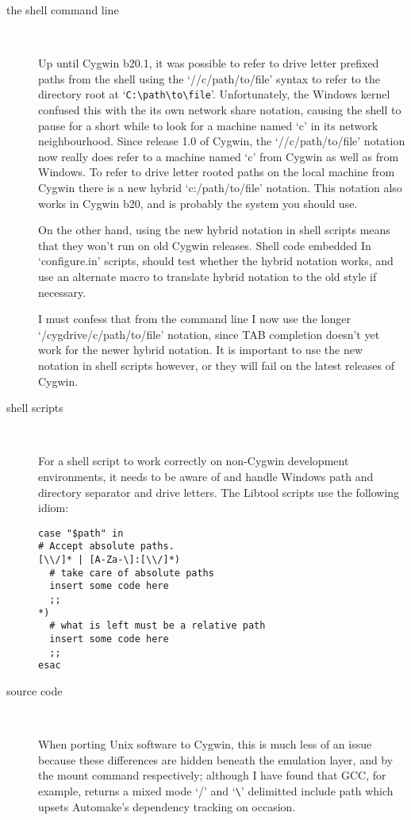 \begin{description}
\item[the shell command line]
\

Up until Cygwin b20.1, it was possible to refer to drive letter prefixed 
paths from the shell using the `//c/path/to/file' syntax to refer to 
the directory root at `\verb+C:\path\to\file+'. Unfortunately, the 
Windows kernel confused this with the its own network share notation, causing 
the shell to pause for a short while to look for a machine named `c' in 
its network neighbourhood. Since release 1.0 of Cygwin, 
the `//c/path/to/file' notation now really does refer to a machine 
named `c' from Cygwin as well as from Windows. To refer to drive letter 
rooted paths on the local machine from Cygwin there is a new 
hybrid `c:/path/to/file' notation. This notation also works in Cygwin b20, and 
is probably the system you should use.

    On the other hand, using the new hybrid notation in shell scripts means that they won't run on old Cygwin releases. Shell code embedded In `configure.in' scripts, should test whether the hybrid notation works, and use an alternate macro to translate hybrid notation to the old style if necessary.

    I must confess that from the command line I now use the longer `/cygdrive/c/path/to/file' notation, since TAB completion doesn't yet work for the newer hybrid notation. It is important to use the new notation in shell scripts however, or they will fail on the latest releases of Cygwin.

\item[shell scripts]
\

    For a shell script to work correctly on non-Cygwin development environments, it needs to be aware of and handle Windows path and directory separator and drive letters. The Libtool scripts use the following idiom:

     	
\begin{verbatim}
case "$path" in
# Accept absolute paths.
[\\/]* | [A-Za-\]:[\\/]*)
  # take care of absolute paths
  insert some code here
  ;;
*)
  # what is left must be a relative path
  insert some code here
  ;;
esac
\end{verbatim}

\item[source code]
\

    When porting Unix software to Cygwin, this is much less of an issue 
because these differences are hidden beneath the emulation layer, and by the 
mount command respectively; although I have found that GCC, for example,
returns a mixed mode `/' and `\verb+\+' delimitted include path which 
upsets Automake's dependency tracking on occasion.


\end{description}
